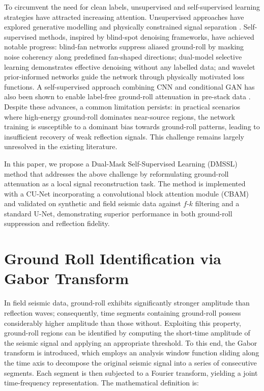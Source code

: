 \documentclass[alpha-refs]{wiley-article}
\begin{document}
To circumvent the need for clean labels, unsupervised and self-supervised learning 
strategies have attracted increasing attention. Unsupervised approaches have explored 
generative modelling \citep{liu2023unsupervised} and physically constrained signal 
separation \citep{sun2025signal}. Self-supervised methods, inspired by blind-spot 
denoising frameworks, have achieved notable progress: blind-fan networks 
\citep{liu2024self} suppress aliased ground-roll by masking noise coherency along 
predefined fan-shaped directions; dual-model selective learning \citep{son2024ground} 
demonstrates effective denoising without any labelled data; and wavelet prior-informed 
networks \citep{xia2024unsupervised} guide the network through physically motivated loss 
functions. A self-supervised approach combining CNN and conditional GAN has also been 
shown to enable label-free ground-roll attenuation in pre-stack data \citep{oliveira2021self}. 
Despite these advances, a common limitation persists: in practical scenarios where 
high-energy ground-roll dominates near-source regions, the network training is susceptible 
to a dominant bias towards ground-roll patterns, leading to insufficient recovery of weak 
reflection signals. This challenge remains largely unresolved in the existing literature.

In this paper, we propose a Dual-Mask Self-Supervised Learning (DMSSL) method that 
addresses the above challenge by reformulating ground-roll attenuation as a local signal 
reconstruction task. The method is implemented with a CU-Net incorporating a convolutional 
block attention module (CBAM) and validated on synthetic and field seismic data against 
$f$-$k$ filtering and a standard U-Net, demonstrating superior performance in both ground-roll 
suppression and reflection fidelity.

\section{Ground Roll Identification via Gabor Transform}

In field seismic data, ground-roll exhibits significantly stronger amplitude than reflection 
waves; consequently, time segments containing ground-roll possess considerably higher amplitude 
than those without. Exploiting this property, ground-roll regions can be identified by computing 
the short-time amplitude of the seismic signal and applying an appropriate threshold. To this end, the Gabor transform is introduced, which employs an analysis window function sliding along the time axis to decompose the original seismic signal into a series of consecutive segments. Each segment is then subjected to a Fourier transform, yielding a joint time-frequency representation. The mathematical definition is:
\end{document}
